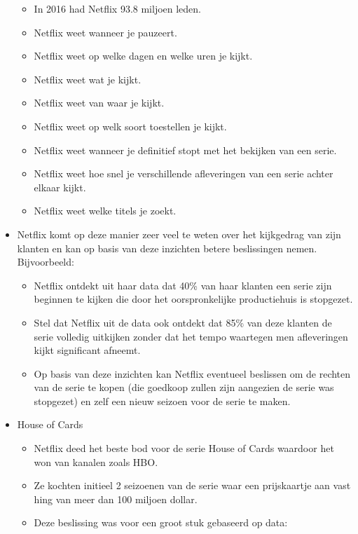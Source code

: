 \documentclass[]{tufte-book}
\providecommand{\tightlist}{%
  \setlength{\itemsep}{0pt}\setlength{\parskip}{0pt}}
\begin{document}
\begin{itemize}
  \begin{itemize}
  \tightlist
  \item
    In 2016 had Netflix 93.8 miljoen leden.
  \item
    Netflix weet wanneer je pauzeert.
  \item
    Netflix weet op welke dagen en welke uren je kijkt.
  \item
    Netflix weet wat je kijkt.
  \item
    Netflix weet van waar je kijkt.
  \item
    Netflix weet op welk soort toestellen je kijkt.
  \item
    Netflix weet wanneer je definitief stopt met het bekijken van een serie.
  \item
    Netflix weet hoe snel je verschillende afleveringen van een serie achter elkaar kijkt.
  \item
    Netflix weet welke titels je zoekt.
  \end{itemize}
\item
  Netflix komt op deze manier zeer veel te weten over het kijkgedrag van zijn klanten en kan op basis van deze inzichten betere beslissingen nemen. Bijvoorbeeld:

  \begin{itemize}
  \tightlist
  \item
    Netflix ontdekt uit haar data dat 40\% van haar klanten een serie zijn beginnen te kijken die door het oorspronkelijke productiehuis is stopgezet.
  \item
    Stel dat Netflix uit de data ook ontdekt dat 85\% van deze klanten de serie volledig uitkijken zonder dat het tempo waartegen men afleveringen kijkt significant afneemt.
  \item
    Op basis van deze inzichten kan Netflix eventueel beslissen om de rechten van de serie te kopen (die goedkoop zullen zijn aangezien de serie was stopgezet) en zelf een nieuw seizoen voor de serie te maken.
  \end{itemize}
\item
  House of Cards

  \begin{itemize}
  \tightlist
  \item
    Netflix deed het beste bod voor de serie House of Cards waardoor het won van kanalen zoals HBO.
  \item
    Ze kochten initieel 2 seizoenen van de serie waar een prijskaartje aan vast hing van meer dan 100 miljoen dollar.
  \item
    Deze beslissing was voor een groot stuk gebaseerd op data:


\end{itemize}
\end{itemize}
\end{document}

